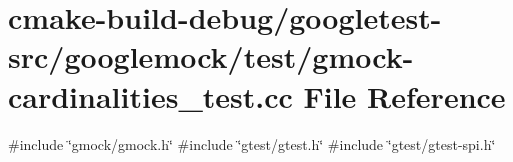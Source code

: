 \hypertarget{gmock-cardinalities__test_8cc}{}\section{cmake-\/build-\/debug/googletest-\/src/googlemock/test/gmock-\/cardinalities\+\_\+test.cc File Reference}
\label{gmock-cardinalities__test_8cc}
{\ttfamily \#include \char`\"{}gmock/gmock.\+h\char`\"{}}\newline
{\ttfamily \#include \char`\"{}gtest/gtest.\+h\char`\"{}}\newline
{\ttfamily \#include \char`\"{}gtest/gtest-\/spi.\+h\char`\"{}}\newline
